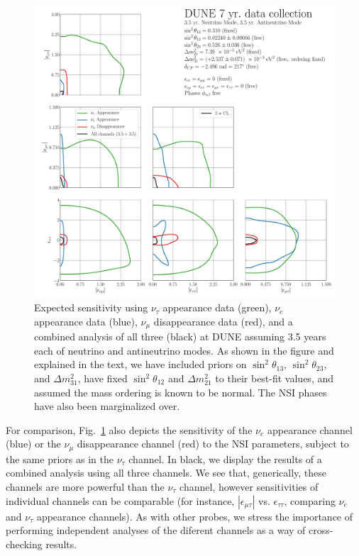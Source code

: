\documentclass[aps,prd,onecolumn,nofootinbib,superscriptaddress, 11pt]{revtex4}
\begin{document}
\begin{figure}[ht]
\centerline{
\includegraphics[width=1\textwidth]{NSIResults.pdf}}
\caption{Expected sensitivity using $\nu_\tau$ appearance data (green), $\nu_e$ appearance data (blue), $\nu_\mu$ disappearance data (red), and a combined analysis of all three (black) at DUNE assuming 3.5 years each of neutrino and antineutrino modes. As shown in the figure and explained in the text, we have included priors on $\sin^2\theta_{13}$, $\sin^2\theta_{23}$, and $\Delta m_{31}^2$, have fixed $\sin^2\theta_{12}$ and $\Delta m_{21}^2$ to their best-fit values, and assumed the mass ordering is known to be normal. The NSI phases have also been marginalized over.}
\label{fig:NSISensitivity}
\end{figure}

For comparison, Fig.~\ref{fig:NSISensitivity} also depicts the sensitivity of the $\nu_e$ appearance channel (blue) or the $\nu_\mu$ disappearance channel (red) to the NSI parameters, subject to the same priors as in the $\nu_\tau$ channel. In black, we display the results of a combined analysis using all three channels. We see that, generically, these channels are more powerful than the $\nu_\tau$ channel, however sensitivities of individual channels can be comparable (for instance, $|\epsilon_{\mu\tau}|$ vs. $\epsilon_{\tau\tau}$, comparing $\nu_e$ and $\nu_\tau$ appearance channels). As with other probes, we stress the importance of performing independent analyses of the diferent channels as a way of cross-checking results. %
\end{document}
